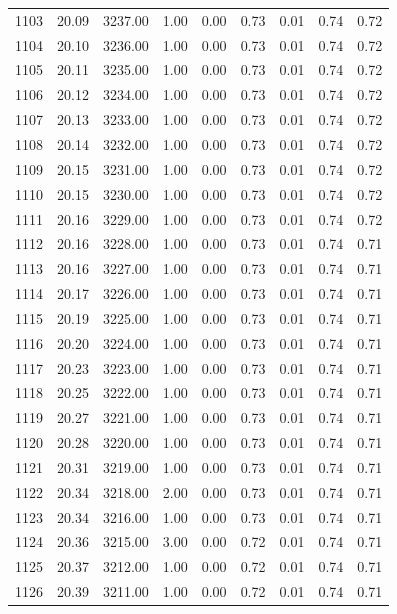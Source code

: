 \documentclass{article}\usepackage[]{graphicx}\usepackage[]{color}
\begin{document}
\begin{longtable}{rrrrrrrrr}
  1103 & 20.09 & 3237.00 & 1.00 & 0.00 & 0.73 & 0.01 & 0.74 & 0.72 \\ 
  1104 & 20.10 & 3236.00 & 1.00 & 0.00 & 0.73 & 0.01 & 0.74 & 0.72 \\ 
  1105 & 20.11 & 3235.00 & 1.00 & 0.00 & 0.73 & 0.01 & 0.74 & 0.72 \\ 
  1106 & 20.12 & 3234.00 & 1.00 & 0.00 & 0.73 & 0.01 & 0.74 & 0.72 \\ 
  1107 & 20.13 & 3233.00 & 1.00 & 0.00 & 0.73 & 0.01 & 0.74 & 0.72 \\ 
  1108 & 20.14 & 3232.00 & 1.00 & 0.00 & 0.73 & 0.01 & 0.74 & 0.72 \\ 
  1109 & 20.15 & 3231.00 & 1.00 & 0.00 & 0.73 & 0.01 & 0.74 & 0.72 \\ 
  1110 & 20.15 & 3230.00 & 1.00 & 0.00 & 0.73 & 0.01 & 0.74 & 0.72 \\ 
  1111 & 20.16 & 3229.00 & 1.00 & 0.00 & 0.73 & 0.01 & 0.74 & 0.72 \\ 
  1112 & 20.16 & 3228.00 & 1.00 & 0.00 & 0.73 & 0.01 & 0.74 & 0.71 \\ 
  1113 & 20.16 & 3227.00 & 1.00 & 0.00 & 0.73 & 0.01 & 0.74 & 0.71 \\ 
  1114 & 20.17 & 3226.00 & 1.00 & 0.00 & 0.73 & 0.01 & 0.74 & 0.71 \\ 
  1115 & 20.19 & 3225.00 & 1.00 & 0.00 & 0.73 & 0.01 & 0.74 & 0.71 \\ 
  1116 & 20.20 & 3224.00 & 1.00 & 0.00 & 0.73 & 0.01 & 0.74 & 0.71 \\ 
  1117 & 20.23 & 3223.00 & 1.00 & 0.00 & 0.73 & 0.01 & 0.74 & 0.71 \\ 
  1118 & 20.25 & 3222.00 & 1.00 & 0.00 & 0.73 & 0.01 & 0.74 & 0.71 \\ 
  1119 & 20.27 & 3221.00 & 1.00 & 0.00 & 0.73 & 0.01 & 0.74 & 0.71 \\ 
  1120 & 20.28 & 3220.00 & 1.00 & 0.00 & 0.73 & 0.01 & 0.74 & 0.71 \\ 
  1121 & 20.31 & 3219.00 & 1.00 & 0.00 & 0.73 & 0.01 & 0.74 & 0.71 \\ 
  1122 & 20.34 & 3218.00 & 2.00 & 0.00 & 0.73 & 0.01 & 0.74 & 0.71 \\ 
  1123 & 20.34 & 3216.00 & 1.00 & 0.00 & 0.73 & 0.01 & 0.74 & 0.71 \\ 
  1124 & 20.36 & 3215.00 & 3.00 & 0.00 & 0.72 & 0.01 & 0.74 & 0.71 \\ 
  1125 & 20.37 & 3212.00 & 1.00 & 0.00 & 0.72 & 0.01 & 0.74 & 0.71 \\ 
  1126 & 20.39 & 3211.00 & 1.00 & 0.00 & 0.72 & 0.01 & 0.74 & 0.71 \\ 

\end{longtable}
\end{document}
